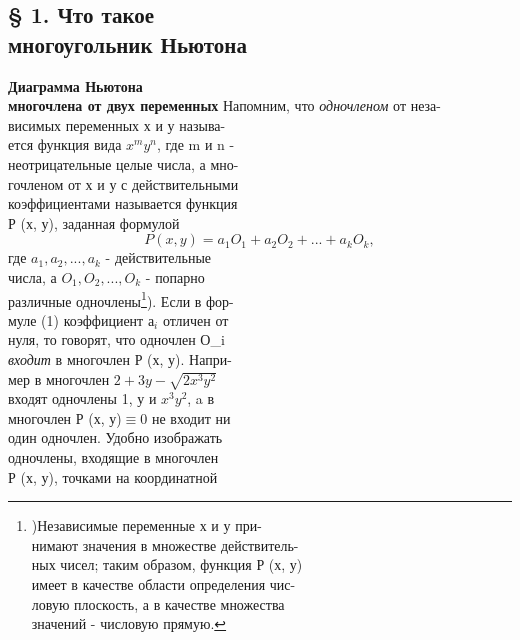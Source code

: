 \documentclass[12pt]{article}
\begin{document}
\begin{multicols}{2}
\begin{flushleft}
\section*{§ 1. Что такое\\ многоугольник Ньютона}
\textbf{Диаграмма Ньютона\\многочлена от двух переменных}
Напомним, что \textit{одночленом} от неза-\\ 
висимых переменных х и у называ-\\
ется функция вида $x^{m} y^{n}$, где m и n -\\
неотрицательные целые числа, а мно-\\
гочленом от х и у с действительными\\
коэффициентами называется функция\\
Р (х, у), заданная формулой\\
\begin{equation}
P (x, y) = a_{1}O_{1} + a_{2}O_{2} + ... + a_{k}O_{k},
\end{equation}
где $a_{1}, a_{2}, ..., a_{k}$ - действительные\\
числа, а $O_{1}, O_{2}, ..., O_{k}$ - попарно\\
различные одночлены\footnote{)Независимые переменные х и у при-\\
нимают значения в множестве действитель-\\
ных чисел; таким образом, функция Р (х, у)\\
имеет в качестве области определения чис-\\
ловую плоскость, а в качестве множества\\
значений - числовую прямую.}). Если в фор-\\
муле (1) коэффициент $а_{i}$ отличен от\\
нуля, то говорят, что одночлен О_{i}\\
\textit{входит} в многочлен Р (х, у). Напри-\\ 
мер в многочлен $2+3y-\sqrt{2x^{3}y^{2}}$\\
входят одночлены 1, у и $x^{3}y^{2}$, a в\\
многочлен Р (х, у)$\equiv0$ не входит ни\\
один одночлен. Удобно изображать\\
одночлены, входящие в многочлен\\
Р (х, у), точками на координатной\\

\end{flushleft}
\end{multicols}
\end{document}
